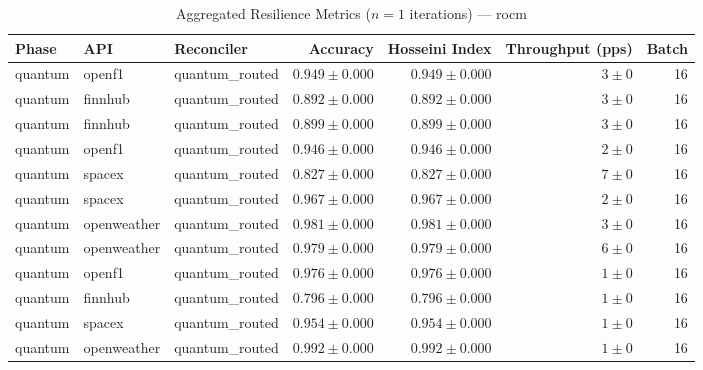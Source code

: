 
\begin{table}[htbp]
\caption{Aggregated Resilience Metrics ($n=1$ iterations) --- rocm}
\begin{tabular}{l l l r r r r}
\hline
Phase & API & Reconciler & Accuracy & Hosseini Index & Throughput (pps) & Batch \\
\hline
quantum & openf1 & quantum\_routed & $0.949\pm0.000$ & $0.949\pm0.000$ & $3\pm0$ & 16 \\
quantum & finnhub & quantum\_routed & $0.892\pm0.000$ & $0.892\pm0.000$ & $3\pm0$ & 16 \\
quantum & finnhub & quantum\_routed & $0.899\pm0.000$ & $0.899\pm0.000$ & $3\pm0$ & 16 \\
quantum & openf1 & quantum\_routed & $0.946\pm0.000$ & $0.946\pm0.000$ & $2\pm0$ & 16 \\
quantum & spacex & quantum\_routed & $0.827\pm0.000$ & $0.827\pm0.000$ & $7\pm0$ & 16 \\
quantum & spacex & quantum\_routed & $0.967\pm0.000$ & $0.967\pm0.000$ & $2\pm0$ & 16 \\
quantum & openweather & quantum\_routed & $0.981\pm0.000$ & $0.981\pm0.000$ & $3\pm0$ & 16 \\
quantum & openweather & quantum\_routed & $0.979\pm0.000$ & $0.979\pm0.000$ & $6\pm0$ & 16 \\
quantum & openf1 & quantum\_routed & $0.976\pm0.000$ & $0.976\pm0.000$ & $1\pm0$ & 16 \\
quantum & finnhub & quantum\_routed & $0.796\pm0.000$ & $0.796\pm0.000$ & $1\pm0$ & 16 \\
quantum & spacex & quantum\_routed & $0.954\pm0.000$ & $0.954\pm0.000$ & $1\pm0$ & 16 \\
quantum & openweather & quantum\_routed & $0.992\pm0.000$ & $0.992\pm0.000$ & $1\pm0$ & 16 \\
\hline
\end{tabular}
\end{table}
